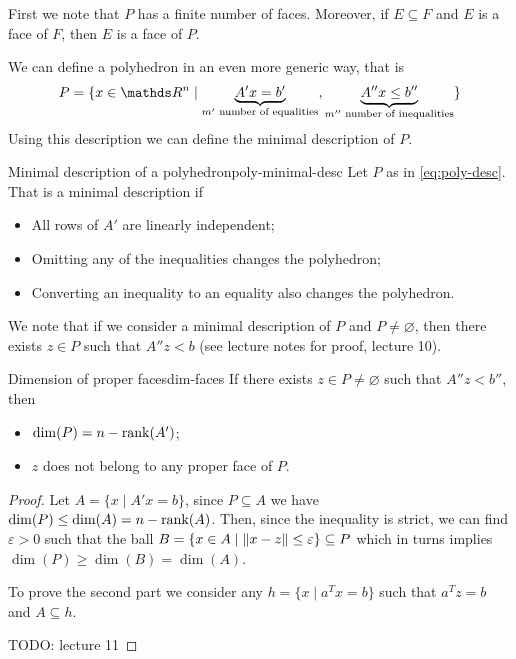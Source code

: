\documentclass[12pt]{extarticle}
\begin{document}
First we note that $P$ has a finite number of faces.
Moreover, if $E \subseteq F$ and $E$ is a face of $F$, then $E$ is a face of $P$.

We can define a polyhedron in an even more generic way, that is
\begin{equation}
	P = \{ x \in \R^n \mid \underbrace{A'x = b'}_{m' \text{ number of equalities}},
	\underbrace{A '' x \leq b''}_{m'' \text{ number of inequalities}} \}
	\label{eq:poly-desc}
\end{equation}
Using this description we can define the minimal description of $P$.
\begin{definition}{Minimal description of a polyhedron}{poly-minimal-desc}
	Let $P$ as in \cref{eq:poly-desc}.
	That is a minimal description if
	\begin{itemize}
		\item All rows of $A'$ are linearly independent;
		\item Omitting any of the inequalities changes the polyhedron;
		\item Converting an inequality to	an equality also changes the polyhedron.
	\end{itemize}
\end{definition}

We note that if we consider a minimal description of $P$ and $P \neq \varnothing$,
then there exists $z \in P$ such that $A''z < b$ (see lecture notes for proof, lecture 10).

\begin{lemma}{Dimension of proper faces}{dim-faces}
	If there exists $z \in P \neq \varnothing$ such that $A'' z<b''$, then
	\begin{itemize}
		\item $\mathrm{dim}(P) = n - \rank(A')$;
		\item $z$ does not belong to any proper face of $P$.
	\end{itemize}
\end{lemma}

\begin{proof}
	Let $A = \{ x \mid A'x = b\}$, since $P \subseteq A$ we have
	$\dim(P) \leq \dim(A) = n - \rank(A)$.
	Then, since the inequality is strict, we can find $\varepsilon > 0$ such that the ball
	$B = \{ x \in A \mid \norm{x - z} \leq \varepsilon \} \subseteq P$ which in turns implies
	$\dim(P) \geq \dim(B) = \dim(A)$.

	To prove the second part we consider any $h = \{x \mid a^T x = b\}$ such that $a^T z = b$
	and $A \subseteq h$.

	TODO: lecture 11
\end{proof}
\end{document}
